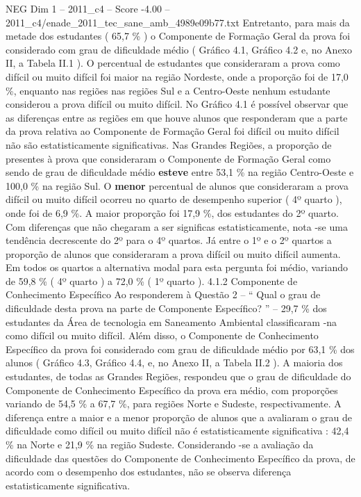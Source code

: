 \begin{textsample}{NEG Dim 1 – 2011\_c4 – Score -4.00 – 2011\_c4/enade\_2011\_tec\_sane\_amb\_4989e09b77.txt}
Entretanto, para mais da metade dos estudantes ( 65,7 \% ) o Componente de Formação Geral da prova foi considerado com grau de dificuldade médio ( Gráfico 4.1, Gráfico 4.2 e, no Anexo II, a Tabela II.1 ).
O percentual de estudantes que consideraram a prova como difícil ou muito difícil foi maior na região Nordeste, onde a proporção foi de 17,0 \%, enquanto nas regiões nas regiões Sul e a Centro-Oeste nenhum estudante considerou a prova difícil ou muito difícil.
No Gráfico 4.1 é possível observar que as diferenças entre as regiões em que houve alunos que responderam que a parte da prova relativa ao Componente de Formação Geral foi difícil ou muito difícil não são estatisticamente significativas.
Nas Grandes Regiões, a proporção de presentes à prova que consideraram o Componente de Formação Geral como sendo de grau de dificuldade médio \textbf{esteve} entre 53,1 \% na região Centro-Oeste e 100,0 \% na região Sul.
O \textbf{menor} percentual de alunos que consideraram a prova difícil ou muito difícil ocorreu no quarto de desempenho superior ( 4º quarto ), onde foi de 6,9 \%.
A maior proporção foi 17,9 \%, dos estudantes do 2º quarto.
Com diferenças que não chegaram a ser significas estatisticamente, nota -se uma tendência decrescente do 2º para o 4º quartos.
Já entre o 1º e o 2º quartos a proporção de alunos que consideraram a prova difícil ou muito difícil aumenta.
Em todos os quartos a alternativa modal para esta pergunta foi médio, variando de 59,8 \% ( 4º quarto ) a 72,0 \% ( 1º quarto ). 4.1.2 Componente de Conhecimento Específico Ao responderem à Questão 2 – “ Qual o grau de dificuldade desta prova na parte de Componente Específico? ” – 29,7 \% dos estudantes da Área de tecnologia em Saneamento Ambiental classificaram -na como difícil ou muito difícil.
Além disso, o Componente de Conhecimento Específico da prova foi considerado com grau de dificuldade médio por 63,1 \% dos alunos ( Gráfico 4.3, Gráfico 4.4, e, no Anexo II, a Tabela II.2 ).
A maioria dos estudantes, de todas as Grandes Regiões, respondeu que o grau de dificuldade do Componente de Conhecimento Específico da prova era médio, com proporções variando de 54,5 \% a 67,7 \%, para regiões Norte e Sudeste, respectivamente.
A diferença entre a maior e a menor proporção de alunos que a avaliaram o grau de dificuldade como difícil ou muito difícil não é estatisticamente significativa : 42,4 \% na Norte e 21,9 \% na região Sudeste.
Considerando -se a avaliação da dificuldade das questões do Componente de Conhecimento Específico da prova, de acordo com o desempenho dos estudantes, não se observa diferença estatisticamente significativa.

\end{textsample}
